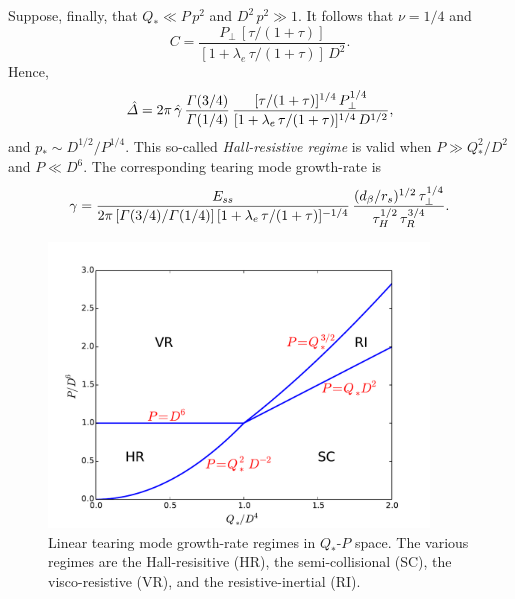 \documentclass[notitlepage,12pt]{article}
\begin{document}
Suppose, finally, that $Q_\ast \ll P\,p^2$ and $D^2\,p^2\gg 1$. It follows that $\nu=1/4$ and
\begin{equation}
C = \frac{P_\perp\,[\tau/(1+\tau)]}{[1+\lambda_e\,\tau/(1+\tau)]\,D^2}.
\end{equation} 
Hence,
\begin{equation} 
\hat{\mit\Delta} = 2\pi\,\hat{\gamma}\,\frac{{\mit\Gamma}(3/4)}{{\mit\Gamma}(1/4)}\,\frac{[\tau/(1+\tau)]^{1/4}\,P_\perp^{1/4}}{[1+\lambda_e\,\tau/(1+\tau)]^{1/4}\,D^{1/2}},
\end{equation}
and $p_\ast \sim D^{1/2}/P^{1/4}$. This so-called {\em Hall-resistive regime}\/ is valid when $P\gg Q_\ast^2/D^2$ and
$P\ll D^6$. The corresponding tearing mode growth-rate is 
\begin{equation}\label{e371}
\gamma= \frac{E_{ss}}{2\pi\,[{\mit\Gamma}(3/4)/{\mit\Gamma}(1/4)]\,[1+\lambda_e\,\tau/(1+\tau)]^{-1/4}}\,\frac{(d_\beta/r_s)^{1/2}\,\tau_\perp^{1/4}}{\tau_H^{1/2}\,\tau_R^{3/4}}.
\end{equation}

\begin{figure}[t]
\centerline{\includegraphics[width=0.9\textwidth]{RegimeIII.pdf}}
\caption{Linear tearing mode growth-rate regimes  in $Q_\ast$-$P$ space. The various regimes are
the Hall-resisitive (HR), the semi-collisional (SC),  the visco-resistive (VR), and the resistive-inertial (RI).}\label{f3}
\end{figure}
\end{document}
